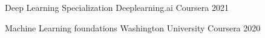 

\begin{cvhonors}

    


            \cvhonor
        {Deep Learning Specialization} %
        {Deeplearning.ai Coursera} %
    {} %
    {2021} %
%     
    
     \cvhonor
        {Machine Learning foundations} %
  {Washington University Coursera} %
    {} %
    {2020} %
  

\end{cvhonors}